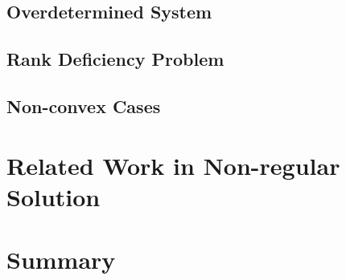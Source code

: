 \subsection{Overdetermined System}


\subsection{Rank Deficiency Problem}



\subsection{Non-convex Cases}



\section{Related Work in Non-regular Solution}
\label{sec:relatedworknonreg}




\section{Summary}



%   






